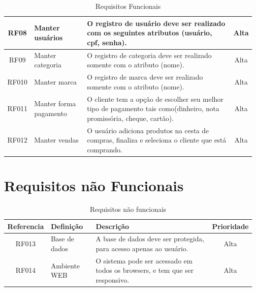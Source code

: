 \documentclass[chapter=TITLE,12pt,oneside,a4paper,english,french,sumario=tradicional,spanish,brazil,]{abntex2}
\begin{document}
\begin{table}[!htpb]
\begin{center}
\begin{tabularx}{\textwidth}{|c|p{3cm}|X|c|}
        \hline
        RF08 &
        Manter usuários &
        O registro de usuário deve ser realizado com os seguintes atributos (usuário, cpf, senha).&
        Alta \\

        \hline
        RF09 &
        Manter categoria &
        O registro de categoria deve ser realizado somente com o atributo (nome).&
        Alta \\

        \hline
        RF010 &
        Manter marca &
        O registro de marca deve ser realizado somente com o atributo (nome).&
        Alta \\

        \hline
        RF011 &
        Manter forma pagamento &
        O cliente tem a opção de escolher seu melhor tipo de pagamento tais como(dinheiro, nota promissória, cheque, cartão).&
        Alta \\

         \hline
        RF012 &
        Manter vendas &
        O usuário adiciona produtos na cesta de compras, finaliza e seleciona o cliente que está comprando.&
        Alta \\
        \hline
        \end{tabularx}\caption{Requisitos Funcionais}\label{}
    \end{center}
\end{table}


\newpage

\section{Requisitos não Funcionais}
\renewcommand\tabularxcolumn[1]{m{#1}}
\begin{table}[!htpb]
    \begin{center}
        \begin{tabularx}{\textwidth}{|c|p{3cm}|X|c|}
        \rowcolor[gray]{0.9}
        \hline
        Referencia &
        Definição &
        Descrição &
        Prioridade \\

         \hline
        RF013 &
        Base de dados &
        A base de dados deve ser protegida, para acesso apenas ao usuário.&
        Alta \\

         \hline
        RF014 &
        Ambiente WEB &
        O sistema pode ser acessado em todos os browsers, e tem que ser responsivo.&
        Alta \\

        \hline
        \end{tabularx}\caption{Requisitos não funcionais}\label{}
    \end{center}
\end{table}
\end{document}

